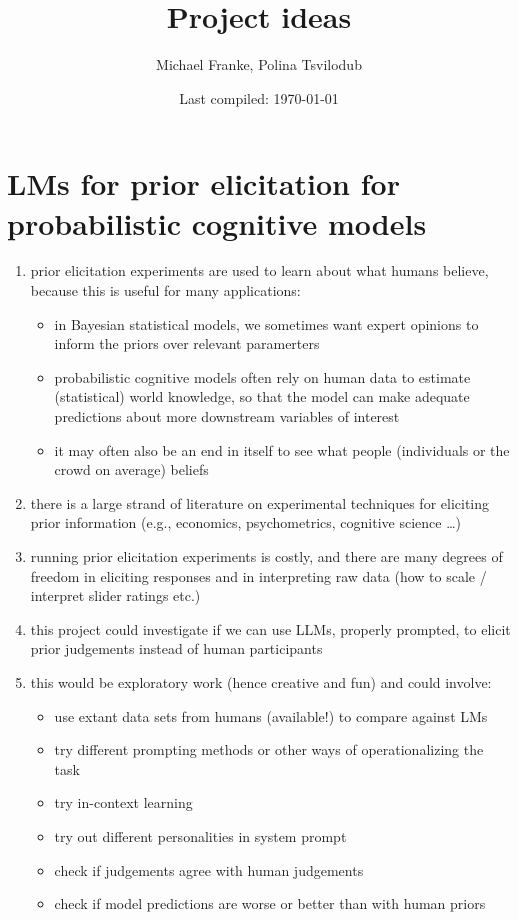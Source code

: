 \documentclass[fleqn,reqno,10pt]{article}
\title{Project ideas}
\author{Michael Franke, Polina Tsvilodub}
\date{Last compiled: \today}
\begin{document}
\maketitle

\section{LMs for prior elicitation for probabilistic cognitive models}

\begin{enumerate}
  \item prior elicitation experiments are used to learn about what humans believe, because this is useful for many applications:
  \begin{itemize}
    \item in Bayesian statistical models, we sometimes want expert opinions to inform the priors over relevant paramerters
    \item probabilistic cognitive models often rely on human data to estimate (statistical) world knowledge, so that the model can make adequate predictions about more downstream variables of interest
    \item it may often also be an end in itself to see what people (individuals or the crowd on average) beliefs
  \end{itemize}
  \item there is a large strand of literature on experimental techniques for eliciting prior information (e.g., economics, psychometrics, cognitive science \dots)
  \item running prior elicitation experiments is costly, and there are many degrees of freedom in eliciting responses and in interpreting raw data (how to scale / interpret slider ratings etc.)
  \item this project could investigate if we can use LLMs, properly prompted, to elicit prior judgements instead of human participants
  \item this would be exploratory work (hence creative and fun) and could involve:
  \begin{itemize}
    \item use extant data sets from humans (available!) to compare against LMs
    \item try different prompting methods or other ways of operationalizing the task
    \item try in-context learning
    \item try out different personalities in system prompt
    \item check if judgements agree with human judgements
    \item check if model predictions are worse or better than with human priors
  \end{itemize}
\end{enumerate}
\end{document}
